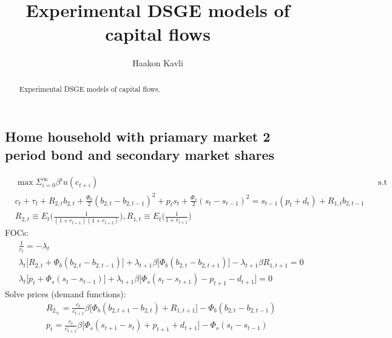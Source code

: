 \documentclass[a4paper]{article}
\begin{document}
\title{Experimental DSGE models of capital flows}
\author{Haakon Kavli}
\maketitle
\begin{abstract}
Experimental DSGE models of capital flows. 
\end{abstract}
\subsection{Home household with priamary market 2 period bond and secondary market shares}
\begin{align}
&\max \Sigma_{i=0}^\infty \beta^i u(c_{t+i}) &&\text{s.t}\\
&c_t+\tau_t+R_{2,t} b_{2,t} + \frac{\Phi_b}{2}(b_{2,t}-b_{2,t-1})^2 + p_ts_t+\frac{\Phi_s}{2}(s_t-s_{t-1})^2=s_{t-1} (p_t+d_t) + R_{1,t} b_{2,t-1}\\
&R_{2,t} \equiv E_t\bigg(\frac{1}{(1+r_{t+1})(1+r_{t+2})} \bigg), R_{1,t} \equiv E_t\bigg(\frac{1}{1+r_{t+1}} \bigg)
\end{align}
FOCs:
\begin{align}
&\frac{1}{c_t}=-\lambda_t\\
&\lambda_t\big[R_{2,t}+\Phi_b (b_{2,t}-b_{2,t-1})\big ]+ \lambda_{t+1} \beta \big[\Phi_b (b_{2,t} - b_{2,t+1})]-\lambda_{t+1}\beta R_{1,t+1}=0\\
&\lambda_t \big[p_t + \Phi_s (s_t-s_{t-1})\big] + \lambda_{t+1} \beta \big[\Phi_s  (s_t-s_{t+1}) - p_{t+1}-d_{t+1}\big]=0
\end{align}
Solve prices (demand functions):
\begin{align}
&R_{2,_t}=\frac{c_t}{c_{t+1}}\beta \big[\Phi_b (b_{2,t+1} - b_{2,t})+R_{1,t+1}\big] -\Phi_b (b_{2,t}-b_{2,t-1})\\
&p_t=\frac{c_t}{c_{t+1}}\beta \bigg[ \Phi_s (s_{t+1}-s_t)+p_{t+1}+d_{t+1} \bigg] - \Phi_s (s_t - s_{t-1})
\end{align}
\end{document}

